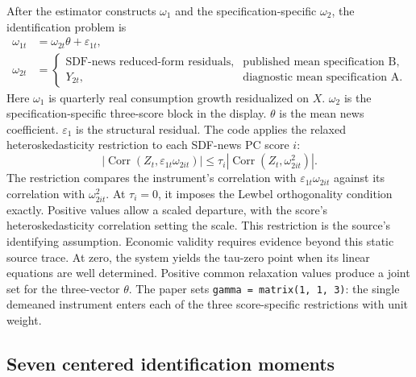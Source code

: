 \documentclass[11pt]{article}
\DeclareRobustCommand{\code}[1]{%
  \ifmmode\text{\ttfamily\detokenize{#1}}\else\nolinkurl{#1}\fi}
\begin{document}
After the estimator constructs $\omega_1$ and the specification-specific $\omega_2$, the
identification problem is
\begin{align*}
  \omega_{1t} &= \omega_{2t}\theta + \varepsilon_{1t},\\
  \omega_{2t} &=
  \begin{cases}
    \text{SDF-news reduced-form residuals}, & \text{published mean specification B},\\
    Y_{2t}, & \text{diagnostic mean specification A}.
  \end{cases}
\end{align*}
Here $\omega_1$ is quarterly real consumption growth residualized on $X$. $\omega_2$ is
the specification-specific three-score block in the display. $\theta$ is the
mean news coefficient. $\varepsilon_1$ is the structural residual.
The code applies the relaxed heteroskedasticity restriction to each SDF-news PC
score $i$:
\[
  \left|\operatorname{Corr}
    \left(Z_t,\varepsilon_{1t}\omega_{2it}\right)\right|
  \leq \tau_i
  \left|\operatorname{Corr}\left(Z_t,\omega_{2it}^{2}\right)\right| .
\]
The restriction compares the instrument's correlation with
$\varepsilon_{1t}\omega_{2it}$ against its correlation with $\omega_{2it}^2$. At
$\tau_i=0$, it imposes the Lewbel orthogonality condition exactly. Positive
values allow a scaled departure, with the score's heteroskedasticity correlation
setting the scale. This restriction is the source's identifying assumption.
Economic validity requires evidence beyond this static source trace. At zero, the
system yields the tau-zero point when its linear equations are well determined.
Positive common relaxation values
produce a joint set for the three-vector $\theta$. The paper sets
\code{gamma = matrix(1, 1, 3)}: the single demeaned instrument enters each of
the three score-specific restrictions with unit weight.

\subsection{Seven centered identification moments}
\label{sec:moments}
\end{document}
